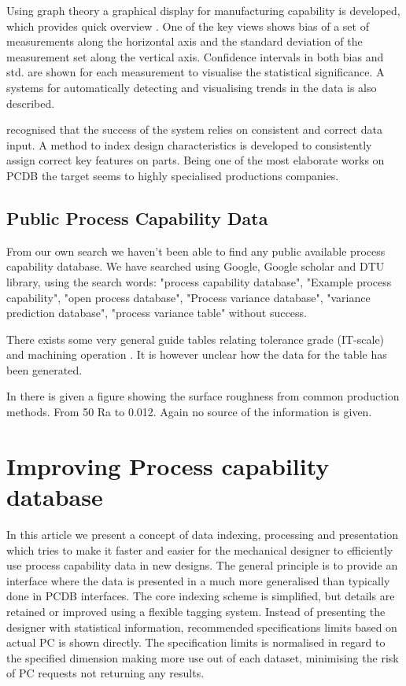\documentclass[aip,amsmath, preprint, author-year]{revtex4-1}
\begin{document}
Using graph theory a graphical display for manufacturing capability is developed, which provides quick overview \citep{thornton2000use}. 
One of the key views shows bias of a set of measurements along the horizontal axis and the standard deviation of the measurement set along the vertical axis. 
Confidence intervals in both bias and std. are shown for each measurement to visualise the statistical significance. 
A systems for automatically detecting and visualising trends in the data is also described.

\cite{kern2003forecasting} recognised that the success of the system relies on consistent and correct data input. 
A method to index design characteristics is developed to consistently assign correct key features on parts. 
Being one of the most elaborate works on PCDB the target seems to highly specialised productions companies. 


\subsection{Public Process Capability Data}
From our own search we haven't been able to find any public available process capability database. 
We have searched using Google, Google scholar and DTU library, using the search words: "process capability database", "Example process capability", "open process database", "Process variance database", "variance prediction database", "process variance table" without success. 

There exists some very general guide tables relating tolerance grade (IT-scale) and machining operation \citep{united1967preferred, american1978preferred}. 
It is however unclear how the data for the table has been generated.

In \cite[p. 715]{oberg2008machinery} there is given a figure showing the surface roughness from common production methods. From 50 Ra to 0.012. 
Again no source of the information is given. \\[1cm]


\section{Improving Process capability database}
In this article we present a concept of data indexing, processing and presentation which tries to make it faster and easier for the mechanical designer to efficiently use process capability data in new designs. 
The general principle is to provide an interface where the data is presented in a much more generalised than typically done in PCDB interfaces. 
The core indexing scheme is simplified, but details are retained or improved using a flexible tagging system. 
Instead of presenting the designer with statistical information, recommended specifications limits based on actual PC is shown directly. 
The specification limits is normalised in regard to the specified dimension making more use out of each dataset, minimising the risk of PC requests not returning any results. 
\end{document}
